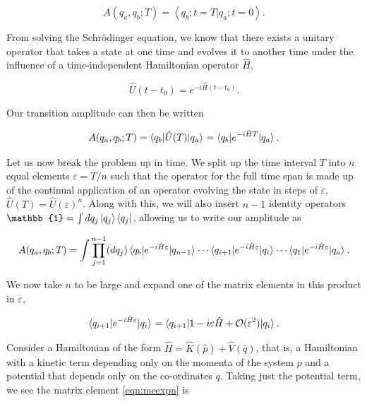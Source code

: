 \begin{equation}
A(q_a, q_b; T) = \left < q_b; t=T| q_a; t=0 \right >.
\end{equation}

From solving the Schr\"{o}dinger equation, we know that there exists a unitary operator that takes a state at one time and evolves it to another time under the influence of a time-independent Hamiltonian operator $\hat{H}$,

\begin{equation}
\hat{U}(t-t_0) = e^{-i \hat{H}(t-t_0)}.
\end{equation}

Our transition amplitude can then be written

\begin{equation}
A(q_a, q_b; T) = \mathinner{\langle q_b\vert\hat{U}(T)\vert q_a\rangle}_{} = \mathinner{\langle q_b\vert e^{-i \hat{H}T}\vert q_a\rangle}_{}.
\end{equation} 

Let us now break the problem up in time. We split up the time interval $T$ into $n$ equal elements $\varepsilon = T/n$ such that the operator for the full time span is made up of the continual application of an operator evolving the state in steps of $\varepsilon$, $\hat{U}(T) = \hat{U}(\varepsilon)^n$. Along with this, we will also insert $n-1$ identity operators $\mathbb{1} = \int dq_j \ket{q_j} \bra{q_j}$, allowing us to write our amplitude as

\begin{equation}
\label{eqn:generalamp}
A(q_a, q_b;T) = \int \prod_{j=1}^{n-1} (dq_j) \mathinner{\langle q_b\vert e^{-i \hat{H} \varepsilon}\vert q_{n-1}\rangle}_{} \cdots \mathinner{\langle q_{i+1}\vert e^{-i \hat{H} \varepsilon}\vert q_{i}\rangle}_{} \cdots \mathinner{\langle q_1\vert e^{-i \hat{H} \varepsilon}\vert q_a\rangle}_{}.\end{equation}

We now take $n$ to be large and expand one of the matrix elements in this product in $\varepsilon$,

\begin{equation}
\label{eqn:meexpn}
\mathinner{\langle q_{i+1}\vert e^{-i \hat{H} \varepsilon}\vert q_i\rangle}_{} = \mathinner{\langle q_{i+1}\vert1 - i \varepsilon \hat{H} + \mathcal{O}(\varepsilon^2)\vert q_i\rangle}_{}.
\end{equation}

Consider a Hamiltonian of the form $\hat{H} = \hat{K}(\hat{p}) + \hat{V}(\hat{q})$, that is, a Hamiltonian with a kinetic term depending only on the momenta of the system $p$ and a potential that depends only on the co-ordinates $q$. Taking just the potential term, we see the matrix element \ref{eqn:meexpn} is

